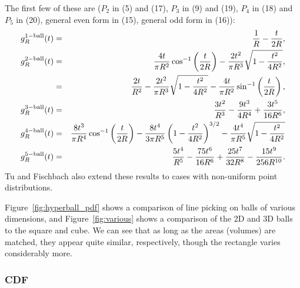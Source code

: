 The first few of these are \cite{tu00:_circle_line} ($P_2$ in (5) and
(17), $P_3$ in (9) and (19), $P_4$ in (18) and $P_5$ in (20), general
even form in (15), general odd form in (16)):
\begin{eqnarray}
  \label{eq:ball_line_picking}
  g^{1-{\rm ball}}_R(t) & = & \frac{1}{R} - \frac{t}{2 R}   \label{eq:line_line_picking}, \\
  g^{2-{\rm ball}}_R(t) & = & \frac{4 t}{\pi R^2} \cos^{-1} \left( \frac{t}{2R} \right)
               - \frac{2 t^2}{\pi R^3} \sqrt{1 - \frac{t^2}{4 R^2} } \label{eq:2dball_line_picking} , \\
          & = & \frac{2 t}{R^2} 
               - \frac{2 t^2}{\pi R^3} \sqrt{1 - \frac{t^2}{4 R^2} }
               - \frac{4 t}{\pi R^2} \sin^{-1} \left( \frac{t}{2R} \right) \label{eq:2dball_line_picking2} ,  \\
  g^{3-{\rm ball}}_R(t) & = & \frac{3 t^2}{R^3} - \frac{9 t^3}{4 R^4} + \frac{3 t^5}{16 R^6}   \label{eq:sphere_line_picking}  , \\
  g^{4-{\rm ball}}_R(t) & = &  \frac{8 t^3}{\pi R^4} \cos^{-1} \left( \frac{t}{2R} \right) 
              - \frac{8 t^4}{3 \pi R^5} \left( 1 - \frac{t^2}{4 R^2} \right)^{3/2}
               - \frac{4 t^4}{\pi R^5} \sqrt{1 - \frac{t^2}{4 R^2} } \\
  g^{5-{\rm ball}}_R(t) & = & \frac{5 t^4}{R^5} - \frac{75 t^6}{16 R^6} + \frac{25 t^7}{32 R^8} - \frac{15 t^9}{256 R^{10}} .
  \label{eq:ball_line_picking-end}
\end{eqnarray}
Tu and Fischbach \cite{tu00:_circle_line} also extend these results to
cases with non-uniform point distributions.
 
Figure~\ref{fig:hyperball_pdf} shows a comparison of line picking on
balls of various dimensions, and Figure~\ref{fig:various} shows a
comparison of the 2D and 3D balls to the square and cube. We can see
that as long as the areas (volumes) are matched, they appear quite
similar, respectively, though the rectangle varies considerably more.

\subsubsection{CDF}


